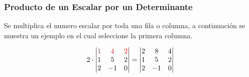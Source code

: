 \documentclass[stu, 12pt, letterpaper, donotrepeattitle, floatsintext, natbib]{apa7}
\begin{document}
\subsubsection{Producto de un Escalar por un Determinante}
Se multiplica el numero escalar por toda una fila o columna, a continuación se muestra un ejemplo en el cual seleccione la primera columna.

\[
2 \cdot
\begin{vmatrix}
  \color{red}1 & \color{red}4 & \color{red}2 \\
  1 & 5 & 2 \\
  2 & -1 & 0 \\
\end{vmatrix}
=
\begin{vmatrix}
  2 & 8 & 4 \\
  1 & 5 & 2 \\
  2 & -1 & 0
\end{vmatrix}
\]
\newpage
\end{document}
